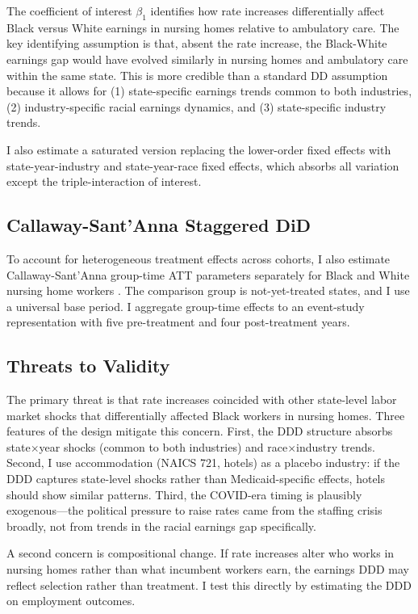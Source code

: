 \documentclass[12pt]{article}
\begin{document}
The coefficient of interest $\beta_1$ identifies how rate increases differentially affect Black versus White earnings in nursing homes relative to ambulatory care. The key identifying assumption is that, absent the rate increase, the Black-White earnings gap would have evolved similarly in nursing homes and ambulatory care within the same state. This is more credible than a standard DD assumption because it allows for (1) state-specific earnings trends common to both industries, (2) industry-specific racial earnings dynamics, and (3) state-specific industry trends.

I also estimate a saturated version replacing the lower-order fixed effects with state-year-industry and state-year-race fixed effects, which absorbs all variation except the triple-interaction of interest.

\subsection{Callaway-Sant'Anna Staggered DiD}

To account for heterogeneous treatment effects across cohorts, I also estimate Callaway-Sant'Anna group-time ATT parameters separately for Black and White nursing home workers \citep{CallawayS2021}. The comparison group is not-yet-treated states, and I use a universal base period. I aggregate group-time effects to an event-study representation with five pre-treatment and four post-treatment years.

\subsection{Threats to Validity}

The primary threat is that rate increases coincided with other state-level labor market shocks that differentially affected Black workers in nursing homes. Three features of the design mitigate this concern. First, the DDD structure absorbs state$\times$year shocks (common to both industries) and race$\times$industry trends. Second, I use accommodation (NAICS 721, hotels) as a placebo industry: if the DDD captures state-level shocks rather than Medicaid-specific effects, hotels should show similar patterns. Third, the COVID-era timing is plausibly exogenous---the political pressure to raise rates came from the staffing crisis broadly, not from trends in the racial earnings gap specifically.

A second concern is compositional change. If rate increases alter who works in nursing homes rather than what incumbent workers earn, the earnings DDD may reflect selection rather than treatment. I test this directly by estimating the DDD on employment outcomes.
\end{document}
